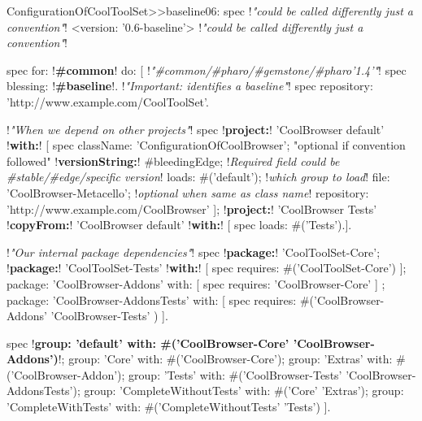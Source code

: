 \documentclass[a4paper,10pt,twoside]{book}
\begin{document}
\begin{footnotesize}
\begin{code}{}
ConfigurationOfCoolToolSet>>baseline06: spec 						!\emph{"could be called differently just a convention"}!
       <version: '0.6-baseline'> 						                        !\emph{"could be called differently just a convention"}!
       
       spec for: !\textbf{\#common}! do: [                                    !\emph{"\#common/\#pharo/\#gemstone/\#pharo'1.4'"}!     
              spec blessing: !\textbf{\#baseline}!.				                       !\emph{"Important: identifies a baseline"}!  
              spec repository: 'http://www.example.com/CoolToolSet'.
              
              !\emph{"When we depend on other projects"}!
              spec !\textbf{project:}! 'CoolBrowser default' !\textbf{with:}! [
                        spec
                            className: 'ConfigurationOfCoolBrowser';  "optional if convention followed"
                            !\textbf{versionString:}! #bleedingEdge;			   !\emph{Required field could be \#stable/\#edge/specific version}!
                            loads: #('default');				!\emph{which group to load}!
                            file: 'CoolBrowser-Metacello'; !\emph{optional when same as class name}!
                            repository: 'http://www.example.com/CoolBrowser' ];
                     !\textbf{project:}! 'CoolBrowser Tests' 
                            !\textbf{copyFrom:}! 'CoolBrowser default' 
                            !\textbf{with:}! [ spec loads: #('Tests').].
             
             !\emph{"Our internal package dependencies"}!
              spec 
                 !\textbf{package:}! 'CoolToolSet-Core';
                 !\textbf{package:}! 'CoolToolSet-Tests' !\textbf{with:}! [ spec requires: #('CoolToolSet-Core') ];
                 package: 'CoolBrowser-Addons' with: [ spec requires: 'CoolBrowser-Core' ] ;
                 package: 'CoolBrowser-AddonsTests' with: [ 
                      spec requires: #('CoolBrowser-Addons' 'CoolBrowser-Tests' ) ].
                      
      		 spec 
                 !\textbf{group: 'default' with: \#('CoolBrowser-Core' 'CoolBrowser-Addons')}!;
                 group: 'Core' with: #('CoolBrowser-Core');
                 group: 'Extras' with: #('CoolBrowser-Addon');
                 group: 'Tests' with: #('CoolBrowser-Tests' 'CoolBrowser-AddonsTests');
                 group: 'CompleteWithoutTests' with: #('Core' 'Extras');
                 group: 'CompleteWithTests' with: #('CompleteWithoutTests' 'Tests')
          ].  
\end{code}\end{footnotesize} 
\end{document}
